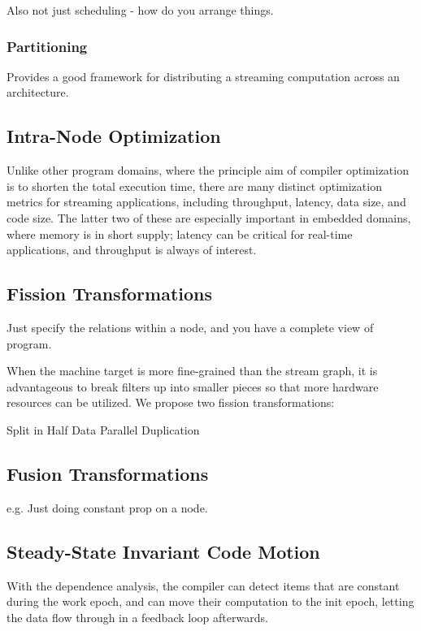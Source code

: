 Also not just scheduling - how do you arrange things.

\subsubsection{Partitioning}

Provides a good framework for distributing a streaming computation
across an architecture.

\subsection{Intra-Node Optimization}

Unlike other program domains, where the principle aim of compiler
optimization is to shorten the total execution time, there are many
distinct optimization metrics for streaming applications, including
throughput, latency, data size, and code size.  The latter two of these
are especially important in embedded domains, where memory is in short
supply; latency can be critical for real-time applications, and
throughput is always of interest.

\subsection{Fission Transformations}

Just specify the relations within a node, and you have a complete view
of program.

When the machine target is more fine-grained than the stream graph, it
is advantageous to break filters up into smaller pieces so that more
hardware resources can be utilized.  We propose two fission
transformations:

Split in Half
Data Parallel Duplication

\subsection{Fusion Transformations}

e.g. Just doing constant prop on a node.

\subsection{Steady-State Invariant Code Motion}

With the dependence analysis, the compiler can detect items that are
constant during the work epoch, and can move their computation to the
init epoch, letting the data flow through in a feedback loop afterwards.

